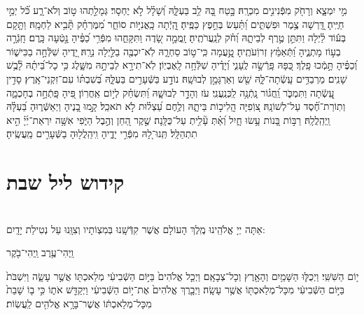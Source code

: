 \documentclass[twoside, openany, parskip=half, 11pt]{book}
\begin{document}


 מִ֣י יִמְצָ֑א וְרָחֹ֖ק מִפְּֿנִינִ֣ים מִכְרָֽהּ׃ \hfill \break
בָּ֣טַח בָּ֭הּ לֵ֥ב בַּעְלָּ֑הּ וְ֝שָׁלָ֗ל לֹ֣א יֶחְסָר׃ \hfill \break
גְּמָלַ֣תְהוּ ט֣וֹב וְלֹא־רָ֑ע כֹּ֝֗ל יְמֵ֣י חַיֶּֽיהָ׃ \hfill \break
דָּֽ֭רְשָׁה צֶ֥מֶר וּפִשְׁתִּ֑ים וַ֝תַּ֗עַשׂ בְּחֵ֣פֶץ כַּפֶּֽיהָ׃ \hfill \break
הָֽ֭יְֿתָה כָּֽאֳנִיּ֣וֹת סוֹחֵ֑ר מִ֝מֶּרְחָ֗ק תָּ֘בִ֥יא לַחְמָֽהּ׃ \hfill \break
וַתָּ֤קָם בְּע֬וֹד לַ֗יְלָה וַתִּתֵּ֣ן טֶ֣רֶף לְבֵיתָ֑הּ וְ֝חֹ֗ק לְנַֽעֲרֹתֶֽיהָ׃ \hfill \break
זָֽמֲמָ֣ה שָׂ֭דֶה וַתִּקָּחֵ֑הוּ מִפְּֿרִ֥י כַ֝פֶּ֗יהָ נָ֣טְֿעָה כָּֽרֶם׃ \hfill \break
חָֽגְֿרָ֣ה בְע֣וֹז מָתְנֶ֑יהָ וַ֝תְּֿאַמֵּ֗ץ זְרוֹֽעֹתֶֽיהָ׃ \hfill \break
טָֽ֣֭עֲמָה כִּֽי־ט֣וֹב סַחְרָ֑הּ לֹֽא־יִכְבֶּ֖ה בַלַּ֣יְלָה נֵרָֽהּ׃ \hfill \break
יָ֭דֶיהָ שִׁלְּֿחָ֣ה בַכִּישׁ֑וֹר וְ֝כַפֶּ֗יהָ תָּ֣מְֿכוּ פָֽלֶךְ׃ \hfill \break
כַּ֭פָּהּ פָּֽרְֿשָׂ֣ה לֶֽעָנִ֑י וְ֝יָדֶ֗יהָ שִׁלְּֿחָ֥ה לָֽאֶבְיֽוֹן׃ \hfill \break
לֹֽא־תִירָ֣א לְבֵיתָ֣הּ מִשָּׁ֑לֶג כִּ֥י כָל־בֵּ֝יתָ֗הּ לָ֘בֻ֥שׁ שָׁנִֽים׃ \hfill \break
מַרְבַדִּ֥ים עָֽשְֿׂתָה־לָּ֑הּ שֵׁ֖שׁ וְאַרְגָּמָ֣ן לְבוּשָֽׁהּ׃ \hfill \break
נוֹדָ֣ע בַּשְּֿׁעָרִ֣ים בַּעְלָּ֑הּ בְּ֝שִׁבְתּ֗וֹ עִם־זִקְנֵי־אָֽרֶץ׃ \hfill \break
סָדִ֣ין עָֽ֭שְֿׂתָה וַתִּמְכֹּ֑ר וַֽ֝חֲג֗וֹר נָֽתְֿנָ֥ה לַֽכְּנַֽעֲנִֽי׃ \hfill \break
עֹז וְהָדָ֣ר לְבוּשָׁ֑הּ וַ֝תִּשְׂחַ֗ק לְי֣וֹם אַֽחֲרֽוֹן׃ \hfill \break
פִּ֭יהָ פָּֽתְֿחָ֣ה בְחָכְמָ֑ה וְתֽוֹרַת־חֶ֝֗סֶד עַל־לְשׁוֹנָֽהּ׃ \hfill \break
צ֭וֹֽפִיָּה הֲֽלִיכ֣וֹת בֵּיתָ֑הּ וְלֶ֥חֶם עַ֝צְל֗וּת לֹ֣א תֹאכֵֽל׃ \hfill \break
קָ֣מוּ בָ֭נֶיהָ וַיְאַשְּֿׁר֑וּהָ בַּ֝עְלָּ֗הּ וַֽיְהַֽלֲלָֽהּ׃ \hfill \break
רַבּ֣וֹת בָּ֭נוֹת עָ֥שׂוּ חָ֑יִל וְ֝אַ֗תְּ עָ֘לִ֥יתְ עַל־כֻּלָּֽנָה׃ \hfill \break
שֶׁ֣קֶר הַ֭חֵן וְהֶ֣בֶל הַיֹּ֑פִי אִשָּׁ֥ה יִרְאַת־יְ֜יָ֗ הִ֣יא תִתְהַלָּֽל׃\hfill \break
תְּֽנוּ־לָ֭הּ מִפְּֿרִ֣י יָדֶ֑יהָ וִֽיהַֽלֲל֖וּהָ בַשְּֿׁעָרִ֣ים מַֽעֲשֶֽׂיהָ׃\hfill \break


\section[קידוש ליל שבת]{ קידוש ליל שבת }

\\
 אַתָּה יְיָ אֱלֹהֵֽינוּ מֶֽלֶךְ הָעוֹלָם אֲשֶׁר קִדְּֿשָֽׁנוּ בְּמִצְוֹתָיו וְצִוָּֽנוּ עַל נְטִילַת יָדָֽיִם: 

\begin{small}
וַֽיְהִי־עֶ֥רֶב וַֽיְהִי־בֹ֖קֶר
\end{small}
 י֥וֹם הַשִּׁשִּֽׁי׃ וַיְכֻלּ֛וּ הַשָּׁמַ֥יִם וְהָאָ֖רֶץ וְכָל־צְבָאָֽם׃ וַיְכַ֤ל אֱלֹהִים֙ בַּיּ֣וֹם הַשְּֿׁבִיעִ֔י מְלַאכְתּ֖וֹ אֲשֶׁ֣ר עָשָׂ֑ה וַיִּשְׁבֹּת֙ בַּיּ֣וֹם הַשְּֿׁבִיעִ֔י מִכָּל־מְלַאכְתּ֖וֹ אֲשֶׁ֥ר עָשָֽׂה׃ וַיְבָ֤רֶךְ אֱלֹהִים֙ אֶת־י֣וֹם הַשְּֿׁבִיעִ֔י וַיְקַדֵּ֖שׁ אֹת֑וֹ כִּ֣י ב֤וֹ שָׁבַת֙ מִכָּל־מְלַאכְתּ֔וֹ אֲשֶׁר־בָּרָ֥א אֱלֹהִ֖ים לַֽעֲשֽׂוֹת׃
\end{document}
